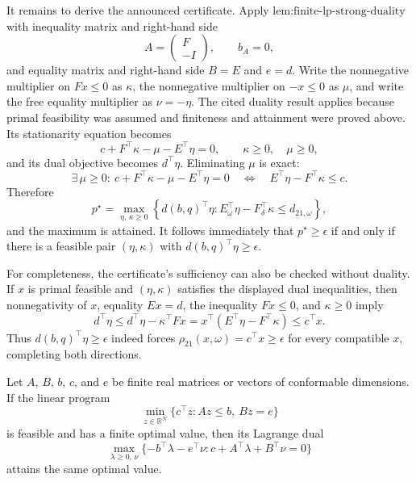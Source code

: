 It remains to derive the announced certificate.  Apply \(\text{lem:finite-lp-strong-duality}\) with inequality matrix and right-hand side
\[
 A=\begin{pmatrix}F\\-I\end{pmatrix},\qquad b_A=0,
\]
and equality matrix and right-hand side \(B=E\) and \(e=d\).  Write the nonnegative multiplier on \(Fx\leq0\) as \(\kappa\), the nonnegative multiplier on \(-x\leq0\) as \(\mu\), and write the free equality multiplier as \(\nu=-\eta\).  The cited duality result applies because primal feasibility was assumed and finiteness and attainment were proved above.  Its stationarity equation becomes
\[
 c+F^\top\kappa-\mu-E^\top\eta=0,
 \qquad \kappa\geq0,\quad \mu\geq0,
\]
and its dual objective becomes \(d^\top\eta\).  Eliminating \(\mu\) is exact:
\[
 \exists\,\mu\geq0:\ c+F^\top\kappa-\mu-E^\top\eta=0
 \quad\Longleftrightarrow\quad
 E^\top\eta-F^\top\kappa\leq c.
\]
Therefore
\[
 p^\star
 =\max_{\eta,\,\kappa\geq0}
 \left\{d(b,q)^\top\eta:
 E_\omega^\top\eta-F_\delta^\top\kappa\leq d_{21,\omega}\right\},
\]
and the maximum is attained.  It follows immediately that \(p^\star\geq\epsilon\) if and only if there is a feasible pair \((\eta,\kappa)\) with \(d(b,q)^\top\eta\geq\epsilon\).

For completeness, the certificate's sufficiency can also be checked without duality.  If \(x\) is primal feasible and \((\eta,\kappa)\) satisfies the displayed dual inequalities, then nonnegativity of \(x\), equality \(Ex=d\), the inequality \(Fx\leq0\), and \(\kappa\geq0\) imply
\[
 d^\top\eta
 \leq d^\top\eta-\kappa^\top Fx
 =x^\top(E^\top\eta-F^\top\kappa)
 \leq c^\top x.
\]
Thus \(d(b,q)^\top\eta\geq\epsilon\) indeed forces \(\rho_{21}(x,\omega)=c^\top x\geq\epsilon\) for every compatible \(x\), completing both directions.

Let \(A\), \(B\), \(b\), \(c\), and \(e\) be finite real matrices or vectors of conformable dimensions.  If the linear program
\[
 \min_{z\in\mathbb R^N}\{c^\top z:Az\leq b,\ Bz=e\}
\]
is feasible and has a finite optimal value, then its Lagrange dual
\[
 \max_{\lambda\geq0,\,\nu}\{-b^\top\lambda-e^\top\nu:
 c+A^\top\lambda+B^\top\nu=0\}
\]
attains the same optimal value.
